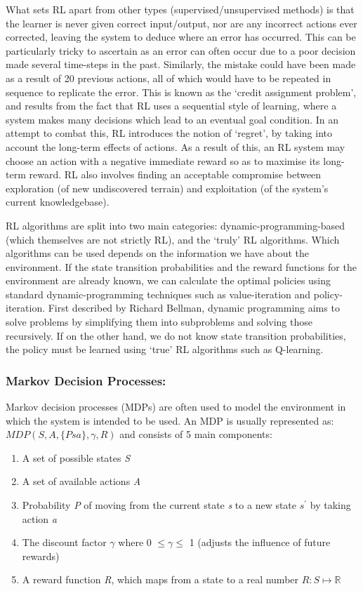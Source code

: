 \documentclass[a4paper,oneside]{report}
\begin{document}
What sets RL apart from other types (supervised/unsupervised methods) is that the learner is never given correct input/output, nor are any incorrect actions ever corrected, leaving the system to deduce where an error has occurred. This can be particularly tricky to ascertain as an error can often occur due to a poor decision made several time-steps in the past. Similarly, the mistake could have been made as a result of 20 previous actions, all of which would have to be repeated in sequence to replicate the error. This is known as the `credit assignment problem', and results from the fact that RL uses a sequential style of learning, where a system makes many decisions which lead to an eventual goal condition. In an attempt to combat this, RL introduces the notion of `regret', by taking into account the long-term effects of actions. As a result of this, an RL system may choose an action with a negative immediate reward so as to maximise its long-term reward. RL also involves finding an acceptable compromise between exploration (of new undiscovered terrain) and exploitation (of the system's current knowledgebase).

RL algorithms are split into two main categories: dynamic-programming-based (which themselves are not strictly RL), and the `truly' RL algorithms. Which algorithms can be used depends on the information we have about the environment. If the state transition probabilities and the reward functions for the environment are already known, we can calculate the optimal policies using standard dynamic-programming techniques such as value-iteration and policy-iteration. First described by Richard Bellman, dynamic programming aims to solve problems by simplifying them into subproblems and solving those recursively. If on the other hand, we do not know state transition probabilities, the policy must be learned using `true' RL algorithms such as Q-learning.

\subsubsection{Markov Decision Processes:}

Markov decision processes (MDPs) are often used to model the environment in which the system is intended to be used. An MDP is usually represented as: $MDP(S, A, \{Psa\}, \gamma, R)$ and consists of 5 main components: 

\begin{enumerate}
	\item A set of possible states \emph{S}
	\item A set of available actions \emph{A}
	\item Probability \emph{P} of moving from the current state \emph{s} to a new state \emph{$s^\prime$} by taking action \emph{a}
	\item The discount factor $\gamma$ where 0 $\leq \gamma \leq$ 1 (adjusts the influence of future rewards)
	\item A reward function \emph{R}, which maps from a state to a real number $R : S \mapsto \mathbb{R}$ 
\end{enumerate}
\end{document}
